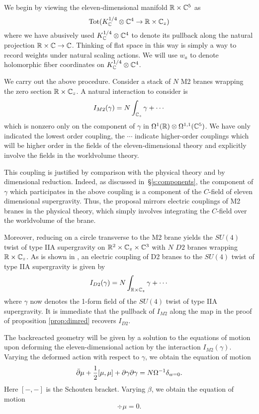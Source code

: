 \parsec[]

We begin by viewing the eleven-dimensional manifold $\mathbb{R}\times \mathbb{C}^5$ as 
\[
\operatorname{Tot}(K^{1/4}_{\mathbb{C}}\otimes \mathbb{C}^4\to \mathbb{R}\times \mathbb{C}_z)
\]
where we have abusively used $K^{1/4}_{\mathbb{C}}\otimes \mathbb{C}^4$ to denote its pullback along the natural projection $\mathbb{R}\times \mathbb{C}\to \mathbb{C}$. Thinking of flat space in this way is simply a way to record weights under natural scaling actions. We will use $w_a$ to denote holomorphic fiber coordinates on $K^{1/4}_{\mathbb{C}}\otimes \mathbb{C}^4$.

We carry out the above procedure. Consider a stack of $N$ M2 branes wrapping the zero section $\mathbb{R}\times \mathbb{C}_z$. A natural interaction to consider is 
\[
I_{M2}(\gamma) = N\int_{\mathbb{C}_z} \gamma + \cdots
\] 
which is nonzero only on the component of $\gamma$ in $\Omega^1(\mathbb{R})\otimes \Omega^{1,1}(\mathbb{C}^5)$. We have only indicated the lowest order coupling, the $\cdots$ indicate higher-order couplings which will be higher order in the fields of the eleven-dimensional theory and explicitly involve the fields in the worldvolume theory. 

This coupling is justified by comparison with the physical theory and by dimensional reduction. 
Indeed, as discussed in~\S\ref{s:components}, the component of $\gamma$ which participates in the above coupling is a component of the $C$-field of eleven dimensional supergravity. Thus, the proposal mirrors electric couplings of M2 branes in the physical theory, which simply involves integrating the $C$-field over the worldvolume of the brane. 

Moreover, reducing on a circle transverse to the M2 brane yields the $SU(4)$ twist of type IIA supergravity on $\mathbb{R}^2\times \mathbb{C}_z\times \mathbb{C}^3$ with $N$ $D2$ branes wrapping $\mathbb{R}\times \mathbb{C}_z$. As is shown in \cite{CLsugra}, an electric coupling of D2 branes to the $SU(4)$ twist of type IIA supergravity is given by 
\[
I_{D2}(\gamma) = N \int_{\mathbb{R}\times\mathbb{C}_z} \gamma + \cdots
\] 
where $\gamma$ now denotes the 1-form field of the $SU(4)$ twist of type IIA supergravity. It is immediate that the pullback of $I_{M2}$ along the map in the proof of proposition \ref{prop:dimred} recovers $I_{D2}$. 


The backreacted geometry will be given by a solution to the equations of motion upon deforming the eleven-dimensional action by the interaction $I_{M2}(\gamma)$. 
Varying the deformed action with respect to $\gamma$,
we obtain the equation of motion
\begin{equation}\label{eqn:ads4eom1}
\bar{\partial} \mu + \frac12 [\mu, \mu] + \partial\gamma\partial\gamma = N \Omega^{-1} \delta_{w=0} .
\end{equation}
Here $[-,-]$ is the Schouten bracket. 
Varying $\beta$, we obtain the equation of motion
\begin{equation}\label{eqn:adseom2}
\div \mu = 0 .
\end{equation}

